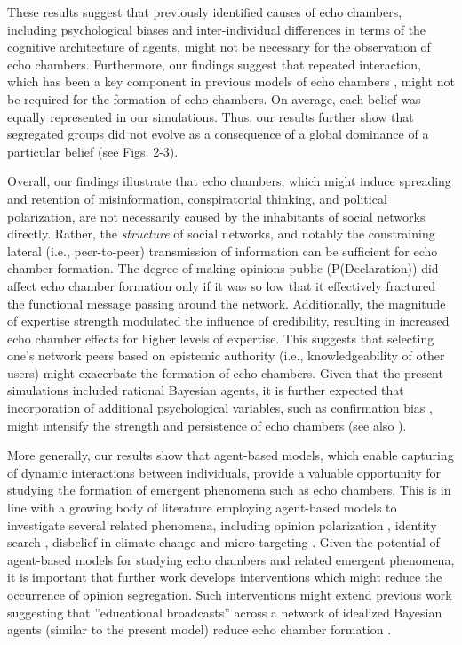 \documentclass[doc,floatsintext]{apa6}
\begin{document}
These results suggest that previously identified causes of echo chambers, including psychological biases and inter-individual differences in terms of the cognitive architecture of agents, might not be necessary for the observation of echo chambers. Furthermore, our findings suggest that repeated interaction, which has been a key component in previous models of echo chambers \citep{madsen2017growing, madsen2018large}, might not be required for the formation of echo chambers. On average, each belief was equally represented in our simulations. Thus, our results further show that segregated groups did not evolve as a consequence of a global dominance of a particular belief (see Figs. 2-3). 

Overall, our findings illustrate that echo chambers, which might induce spreading and retention of misinformation, conspiratorial thinking, and political polarization, are not necessarily caused by the inhabitants of social networks directly. Rather, the \textit{structure} of social networks, and notably the constraining lateral (i.e., peer-to-peer) transmission of information can be sufficient for echo chamber formation. The degree of making opinions public (P(Declaration)) did affect echo chamber formation only if it was so low that it effectively fractured the functional message passing around the network. Additionally, the magnitude of expertise strength modulated the influence of credibility, resulting in increased echo chamber effects for higher levels of expertise. This suggests that selecting one's network peers based on epistemic authority (i.e., knowledgeability of other users) might exacerbate the formation of echo chambers. Given that the present simulations included rational Bayesian agents, it is further expected that incorporation of additional psychological variables, such as confirmation bias \citep{del2016spreading, ngampruetikorn2016bias}, might intensify the strength and persistence of echo chambers (see also \cite{pilditch2017opinion}).

More generally, our results show that agent-based models, which enable capturing of dynamic interactions between individuals, provide a valuable opportunity for studying the formation of emergent phenomena such as echo chambers. This is in line with a growing body of literature employing agent-based models to investigate several related phenomena, including opinion polarization \citep{duggins2017}, identity search \citep{watts2002identity}, disbelief in climate change \citep{lewandowsky2019influence} and micro-targeting \citep{madsen2018method}. Given the potential of agent-based models for studying echo chambers and related emergent phenomena, it is important that further work develops interventions which might reduce the occurrence of opinion segregation. Such interventions might extend previous work suggesting that ''educational broadcasts'' across a network of idealized Bayesian agents (similar to the present model) reduce echo chamber formation \citep{madsen2018large}.
\end{document}
